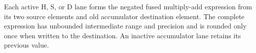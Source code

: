 Each active H, S, or D lane forms the negated fused multiply-add expression
from its two source elements and old accumulator destination element. The
complete expression has unbounded intermediate range and precision and is
rounded only once when written to the destination. An inactive accumulator
lane retains its previous value.
